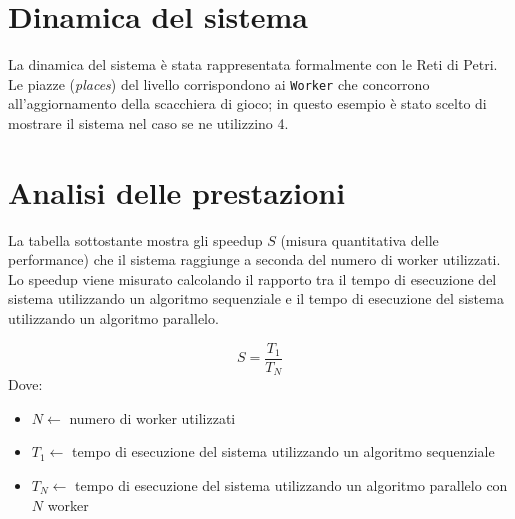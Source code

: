 \documentclass[a4paper]{article}
\begin{document}
\section{Dinamica del sistema}\label{dinamica-del-sistema}
La dinamica del sistema è stata rappresentata formalmente con le Reti di Petri. Le piazze (\textit{places}) del livello corrispondono ai \texttt{Worker} che concorrono all'aggiornamento della scacchiera di gioco; in questo esempio è stato scelto di mostrare il sistema nel caso se ne utilizzino 4.

\section{Analisi delle prestazioni}\label{analisi-delle-prestazioni}
La tabella sottostante mostra gli speedup $S$ (misura quantitativa delle performance) che il sistema raggiunge a seconda del numero di worker utilizzati.\\
Lo speedup viene misurato calcolando il rapporto tra il tempo di esecuzione del sistema utilizzando un algoritmo sequenziale e il tempo di esecuzione del sistema utilizzando un algoritmo parallelo.

\begin{equation}
 S = \frac{T_1}{T_N}
\end{equation}
Dove:
\begin{itemize}
    \item $N \leftarrow$ numero di worker utilizzati
    \item $T_1 \leftarrow$ tempo di esecuzione del sistema utilizzando un algoritmo sequenziale
    \item $T_N \leftarrow$ tempo di esecuzione del sistema utilizzando un algoritmo parallelo con $N$ worker
\end{itemize}
\end{document}
